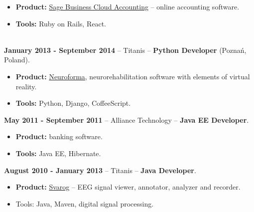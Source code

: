 \documentclass[10pt]{article}
\newenvironment{outerlist}[1][\enskip\textbullet]%
        {\begin{itemize}[#1]}{\end{itemize}%
         \vspace{-.6\baselineskip}}
\begin{document}
\begin{outerlist}
  \item[] \textbf{Product:} \href{http://uk.sageone.com/}{Sage Business Cloud Accounting} -- online accounting software.
  \item[] \textbf{Tools:} Ruby on Rails, React.\\\\
\end{outerlist}

\textbf{January 2013 - September 2014} -- Titanis -- \textbf{Python Developer} (Poznań, Poland).

\begin{outerlist}
 \item[] \textbf{Product:} \href{http://neuro-forma.com}{Neuroforma}, neurorehabilitation software with elements of virtual reality.
 \item[] \textbf{Tools:} Python, Django, CoffeeScript.\\
\end{outerlist}



\textbf{May 2011 - September 2011} -- Alliance Technology -- \textbf{Java EE Developer}.
\begin{outerlist}
  \item[] \textbf{Product:} banking software.
  \item[] \textbf{Tools:} Java EE, Hibernate.\\
\end{outerlist}

\textbf{August 2010 - January 2013} -- Titanis -- \textbf{Java Developer}.
\begin{outerlist}
  \item[] \textbf{Product:} \href{https://github.com/BrainTech/svarog}{Svarog} -- EEG signal viewer, annotator, analyzer and recorder.
  \item[] Tools: Java, Maven, digital signal processing.\\
\end{outerlist}
\end{document}
